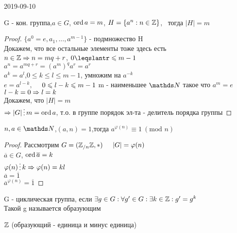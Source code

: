 \documentclass[main]{subfiles}
\begin{document}
	\begin{lect} {2019-09-10}

		\begin{consequence}
		    G - кон. группа,\q $a \in G$, $\mathop{\rm ord}\nolimits a = m$, $H=\{a^n:n \in \mathbb{Z}\}$, \ тогда $|H|=m$
        \end{consequence}

		\begin{proof}
		    $\{a^0=e,a_1,...,a^{m-1}\}$ - подмножество H\\
		    Докажем, что все остальные элементы тоже здесь есть\\
		    $n \in \mathbb{Z} \Rightarrow n=m q+r$, $0 \leqslantr \leqslant m-1$\\
		    $a^n=a^{m q+r}=(a^m)^q a^r=a^r$\\
		    $a^k=a^l$,\q $0 \leqslant k \leqslant l \leqslant m-1$, умножим на $a^{-k}$\\
		    $e=a^{l-k},$ $\quad 0 \leqslant l-k \leqslant m-1$ m - наименьшее $\N$ такое что $a^m=e$\\
		    $l-k=0 \Rightarrow l=k$\\
		    Докажем, что $|H|=m$\\
		    $\Ra |G| \devides m=\ord a$, т.о. в группе порядок эл-та - делитель порядка группы
		\end{proof}
        
        \begin{reminder}
            $n,a \in \N$,\q $(a,n) = 1$,\q тогда $a^{\varphi(n)} \equiv 1 \ (\text{mod } n)$
        \end{reminder}

		\begin{proof}
            Рассмотрим $G=(\mathbb{Z} _{/n} \mathbb{Z}, *)$ $\quad |G|=\varphi(n)$\\
		    $\overline{a} \in G$, $\mathop{\rm ord}\nolimits \overline{a}=k$\\
		    $\varphi(n) \devides k \Ra \varphi(n) = kl$\\
		    $\overline{a}=\overline{1}$\\
		    $\overline{a}^{\varphi(n)}=\overline{1}$
		\end{proof}

	\begin{definition}
	    G - циклическая группа, если $\exists g \in G: \forall g' \in G: \exists k \in \mathbb{Z}: g'=g^k$\\
	    Такой g называется образующим
	\end{definition}

	\begin{definition}
	    $\mathbb{Z}$ (образующий - единица и минус единица)
	\end{definition}


\end{lect}
\end{document}
